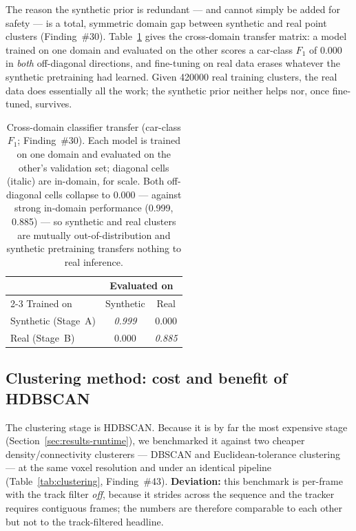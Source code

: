 The reason the synthetic prior is redundant --- and cannot simply be added for
safety --- is a total, symmetric domain gap between synthetic and real point
clusters (Finding~\#30). Table~\ref{tab:cross-domain} gives the cross-domain
transfer matrix: a model trained on one domain and evaluated on the other scores
a car-class $F_1$ of \num{0.000} in \emph{both} off-diagonal directions, and
fine-tuning on real data erases whatever the synthetic pretraining had learned.
Given \num{420000} real training clusters, the real data does essentially all the
work; the synthetic prior neither helps nor, once fine-tuned, survives.

\begin{table}[H]
  \centering
  \caption{Cross-domain classifier transfer (car-class $F_1$; Finding~\#30). Each
    model is trained on one domain and evaluated on the other's validation set;
    diagonal cells (italic) are in-domain, for scale. Both off-diagonal cells
    collapse to \num{0.000} --- against strong in-domain performance
    (\num{0.999}, \num{0.885}) --- so synthetic and real clusters are mutually
    out-of-distribution and synthetic pretraining transfers nothing to real
    inference.}
  \label{tab:cross-domain}
  \begin{tabular}{lcc}
    \toprule
    & \multicolumn{2}{c}{Evaluated on} \\
    \cmidrule(lr){2-3}
    Trained on & Synthetic & Real \\
    \midrule
    Synthetic (Stage~A) & \emph{0.999} & 0.000 \\
    Real (Stage~B)      & 0.000        & \emph{0.885} \\
    \bottomrule
  \end{tabular}
\end{table}

\subsection{Clustering method: cost and benefit of HDBSCAN}
\label{sec:ablation-clustering}

The clustering stage is HDBSCAN. Because it is by far the most expensive stage
(Section~\ref{sec:results-runtime}), we benchmarked it against two cheaper
density/connectivity clusterers --- DBSCAN and Euclidean-tolerance clustering ---
at the same voxel resolution and under an identical pipeline
(Table~\ref{tab:clustering}, Finding~\#43). \textbf{Deviation:} this benchmark is
per-frame with the track filter \emph{off}, because it strides across the
sequence and the tracker requires contiguous frames; the numbers are therefore
comparable to each other but not to the track-filtered headline.

